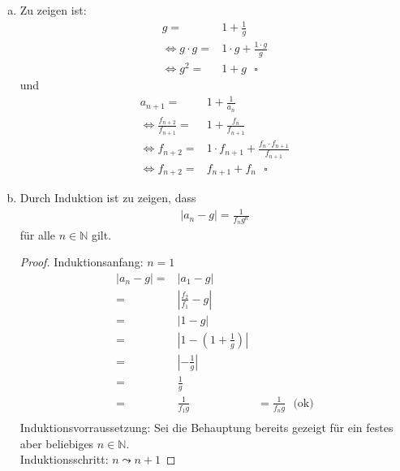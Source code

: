 \documentclass{scrreprt}
\newcommand{\NN}{\mathbb{N}}
\begin{document}
	\begin{enumerate}[(a)]
		\item
            Zu zeigen ist:
            \begin{align*}
                g = & 1 + \frac{1}{g}\\
                \Leftrightarrow g \cdot g = & 1 \cdot g + \frac{1 \cdot g}{g}\\
                \Leftrightarrow g^2 = & 1 + g~~~ \square
            \end{align*}
            und
            \begin{align*}
                a_{n+1} = & 1 + \frac{1}{a_n}\\
                \Leftrightarrow \frac{f_{n+2}}{f_{n+1}} = & 1 + \frac{f_n}{f_{n+1}}\\
                \Leftrightarrow f_{n+2} = & 1 \cdot f_{n+1} + \frac{f_n \cdot f_{n+1}}{f_{n+1}}\\
                \Leftrightarrow f_{n+2} = & f_{n+1} + f_n ~~~ \square
            \end{align*}
	\pagebreak
        \item
            Durch Induktion ist zu zeigen, dass
            \begin{align*}
                \vert a_n - g \vert = \frac{1}{f_n g^n}
            \end{align*}
            für alle $n \in \NN$ gilt.
            \begin{proof}
                Induktionsanfang: $n=1$
                \begin{align*}
                    \vert a_n - g \vert = & \vert a_1 - g \vert&\\ 
                    = & \left\vert \frac{f_2}{f_1} - g\right\vert&\\
                    = & \left\vert 1 - g \right\vert&\\
                    = & \left\vert 1 - (1 + \frac{1}{g}) \right\vert&\\
                    = & \left\vert - \frac{1}{g} \right\vert&\\
                    = & \frac{1}{g}&\\
                    = & \frac{1}{f_1 g} &= \frac{1}{f_n g} ~~~ \text{(ok)}\\
                \end{align*}
                Induktionsvorraussetzung: Sei die Behauptung bereits gezeigt für ein festes aber beliebiges $n \in \NN$.\\
                Induktionsschritt: $n \leadsto n+1$

\end{proof}
\end{enumerate}
\end{document}
